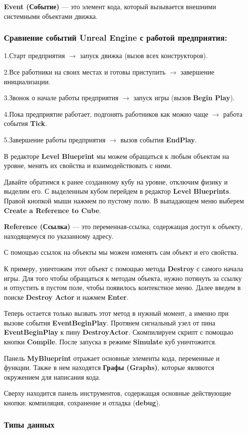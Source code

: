 \textbf{Event (Событие)} — это элемент кода, который вызывается внешними системными объектами движка.

\subsubsection*{Сравнение событий Unreal Engine с работой предприятия:}

1.\hspace{1em}Старт предприятия $\rightarrow$ запуск движка (вызов всех конструкторов).

2.\hspace{1em}Все работники на своих местах и готовы приступить $\rightarrow$ завершение инициализации.

3.\hspace{1em}Звонок о начале работы предприятия $\rightarrow$ запуск игры (вызов \textbf{Begin Play}).

4.\hspace{1em}Пока предприятие работает, подгонять работников как можно чаще $\rightarrow$ работа события \textbf{Tick}.

5.\hspace{1em}Завершение работы предприятия $\rightarrow$ вызов события \textbf{EndPlay}.

В редакторе \textbf{Level Blueprint} мы можем обращаться к любым объектам на уровне, менять их свойства и взаимодействовать с ними.

Давайте обратимся к ранее созданному кубу на уровне, отключим физику и выделим его. С выделенным кубом перейдем в редактор \textbf{Level Blueprints}. Правой кнопкой мыши нажмем по пустому полю. В выпадающем меню выберем \textbf{Create a Reference to Cube}.

\textbf{Reference (Ссылка)} — это переменная-ссылка, содержащая доступ к объекту, находящемуся по указанному адресу.

С помощью ссылок на объекты мы можем изменять сам объект и его свойства.

К примеру, уничтожим этот объект с помощью метода \textbf{Destroy} с самого начала игры. Для того чтобы обращаться к методам объекта, нужно потянуть за ссылку и отпустить в пустом поле, чтобы появилось контекстное меню. Далее введем в поиске \textbf{Destroy Actor} и нажмем \textbf{Enter}.

Теперь остается только вызвать этот метод в нужный момент, а именно при вызове события \textbf{EventBeginPlay}. Протянем сигнальный узел от пина \textbf{EventBeginPlay} к пину \textbf{DestroyActor}. Скомпилируем скрипт с помощью кнопки \textbf{Compile}. После запуска в режиме \textbf{Simulate} куб уничтожится.

Панель \textbf{MyBlueprint} отражает основные элементы кода, переменные и функции. Также в нем находятся \textbf{Графы (Graphs)}, которые являются окружением для написания кода.

Сверху находится панель инструментов, содержащая основные действующие кнопки: компиляция, сохранение и отладка (\textbf{debug}).

\subsubsection{Типы данных}